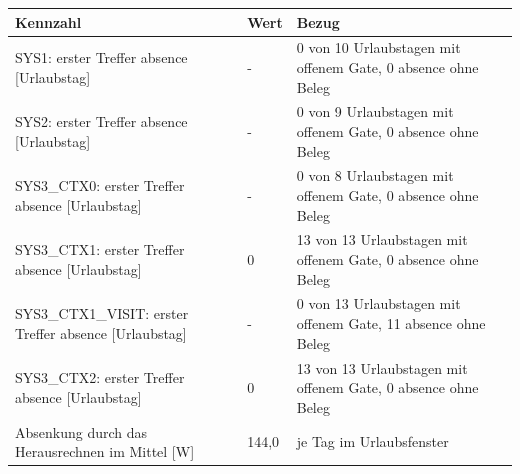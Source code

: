 \begin{tabular}{lll}
\toprule
Kennzahl & Wert & Bezug \\
\midrule
SYS1: erster Treffer absence [Urlaubstag] & - & 0 von 10 Urlaubstagen mit offenem Gate, 0 \texttimes{} absence ohne Beleg \\
SYS2: erster Treffer absence [Urlaubstag] & - & 0 von 9 Urlaubstagen mit offenem Gate, 0 \texttimes{} absence ohne Beleg \\
SYS3\_CTX0: erster Treffer absence [Urlaubstag] & - & 0 von 8 Urlaubstagen mit offenem Gate, 0 \texttimes{} absence ohne Beleg \\
SYS3\_CTX1: erster Treffer absence [Urlaubstag] & 0 & 13 von 13 Urlaubstagen mit offenem Gate, 0 \texttimes{} absence ohne Beleg \\
SYS3\_CTX1\_VISIT: erster Treffer absence [Urlaubstag] & - & 0 von 13 Urlaubstagen mit offenem Gate, 11 \texttimes{} absence ohne Beleg \\
SYS3\_CTX2: erster Treffer absence [Urlaubstag] & 0 & 13 von 13 Urlaubstagen mit offenem Gate, 0 \texttimes{} absence ohne Beleg \\
Absenkung durch das Herausrechnen im Mittel [W] & 144,0 & je Tag im Urlaubsfenster \\
\bottomrule
\end{tabular}
